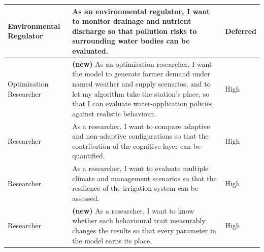 \documentclass{article}
\begin{document}
\begin{changed}
\begin{tabular}{|p{2.8cm}|p{10.8cm}|p{2.6cm}|}
Environmental Regulator & As an environmental regulator, I want to monitor drainage and nutrient discharge so that pollution risks to surrounding water bodies can be evaluated. & \textbf{Deferred} \\ \hline
Optimisation Researcher & \textbf{(new)} As an optimisation researcher, I want the model to generate farmer demand under named weather and supply scenarios, and to let my algorithm take the station's place, so that I can evaluate water-application policies against realistic behaviour. & High \\ \hline
Researcher & As a researcher, I want to compare adaptive and non-adaptive configurations so that the contribution of the cognitive layer can be quantified. & High \\ \hline
Researcher & As a researcher, I want to evaluate multiple climate and management scenarios so that the resilience of the irrigation system can be assessed. & High \\ \hline
Researcher & \textbf{(new)} As a researcher, I want to know whether each behavioural trait measurably changes the results so that every parameter in the model earns its place. & High \\ \hline
\end{tabular}
\label{tab:userstories}
\end{changed}

\end{document}
